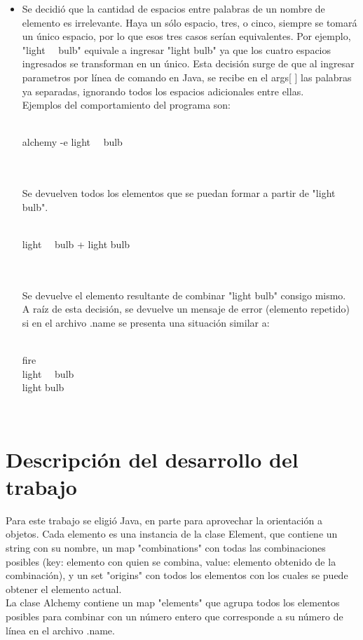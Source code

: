\documentclass[a4paper, 10pt]{article}
\begin{document}
\begin{itemize}
\item Se decidió que la cantidad de espacios entre palabras de un nombre de elemento es irrelevante. Haya un sólo espacio, tres, o cinco, siempre se tomará un único espacio, por lo que esos tres casos serían equivalentes. Por ejemplo, "light \, \, bulb" equivale a ingresar "light bulb" ya que los cuatro espacios ingresados se transforman en un único. Esta decisión surge de que al ingresar parametros por línea de comando en Java, se recibe en el args[ ] las palabras ya separadas, ignorando todos los espacios adicionales entre ellas.\\
Ejemplos del comportamiento del programa son:\\
\\\begin{tt}
alchemy -e light \, \, bulb
\end{tt}\\\\
Se devuelven todos los elementos que se puedan formar a partir de "light bulb".\\
\\\begin{tt}
light \, \, bulb + light bulb
\end{tt}\\\\
Se devuelve el elemento resultante de combinar "light bulb" consigo mismo.\\
A raíz de esta decisión, se devuelve un mensaje de error (elemento repetido) si en el archivo .name se presenta una situación similar a:\\
\\\begin{tt}
fire\\light \, \, bulb\\light bulb
\end{tt}\\
\end{itemize}

\section{Descripción del desarrollo del trabajo}

Para este trabajo se eligió Java, en parte para aprovechar la orientación a objetos. Cada elemento es una instancia de la clase Element, que contiene un string con su nombre, un map "combinations" con todas las combinaciones posibles (key: elemento con quien se combina, value: elemento obtenido de la combinación), y un set "origins" con todos los elementos con los cuales se puede obtener el elemento actual. \\
La clase Alchemy contiene un map "elements" que agrupa todos los elementos posibles para combinar con un número entero que corresponde a su número de línea en el archivo .name. 
\end{document}
